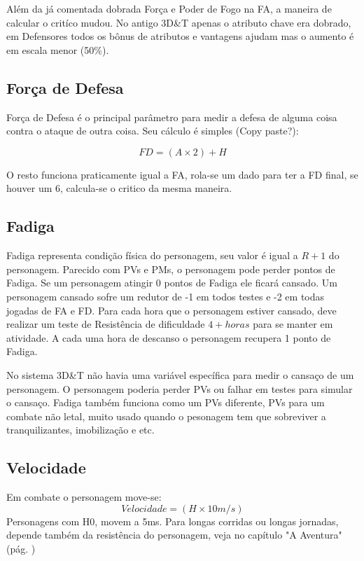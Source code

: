 \begin{framed}
Além da já comentada dobrada Força e Poder de Fogo na FA, a maneira de calcular o critíco mudou. No antigo 3D\&T apenas o atributo chave era dobrado, em Defensores todos os bônus de atributos e vantagens ajudam mas o aumento é em escala menor (50\%).
\end{framed}

\subsection{Força de Defesa}

Força de Defesa é o principal parâmetro para medir a defesa de alguma coisa contra o ataque de outra coisa. Seu cálculo é simples (Copy paste?):

\[ FD = (A \times 2) + H \]

O resto funciona praticamente igual a FA, rola-se um dado para ter a FD final, se houver um 6, calcula-se o critico da mesma maneira.

\subsection{Fadiga}

Fadiga representa condição física do personagem, seu valor é igual a \( R + 1 \) do personagem. Parecido com PVs e PMs, o personagem pode perder pontos de Fadiga. Se um personagem atingir 0 pontos de Fadiga ele ficará cansado. Um personagem cansado sofre um redutor de -1 em todos testes e -2 em todas jogadas de FA e FD. Para cada hora que o personagem estiver cansado, deve realizar um teste de Resistência de dificuldade \( 4 + horas  \) para se manter em atividade. A cada uma hora de descanso o personagem recupera 1 ponto de Fadiga.

\begin{framed}
No sistema 3D\&T não havia uma variável específica para medir o cansaço de um personagem. O personagem poderia perder PVs ou falhar em testes para simular o cansaço. Fadiga também funciona como um PVs diferente, PVs para um combate não letal, muito usado quando o pesonagem tem que sobreviver a tranquilizantes, imobilização e etc.
\end{framed}


\subsection{Velocidade}
Em combate o personagem move-se:
\[ Velocidade = (H \times 10m/s) \]
Personagens com H0, movem a 5m\/s. Para longas corridas ou longas jornadas, depende também da resistência do personagem, veja no capítulo "A Aventura"(pág. \pageref{ch:adventure}) 

